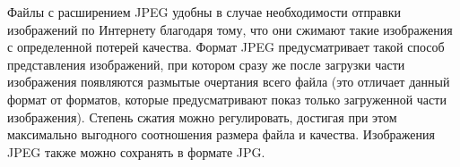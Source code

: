 \documentclass{beamer}
\begin{document}
\begin{frame}
Файлы с расширением JPEG удобны в случае необходимости отправки изображений по Интернету благодаря тому, что они сжимают такие изображения с определенной потерей качества. Формат JPEG предусматривает такой способ представления изображений, при котором сразу же после загрузки части изображения появляются размытые очертания всего файла (это отличает данный формат от форматов, которые предусматривают показ только загруженной части изображения). Степень сжатия можно регулировать, достигая при этом максимально выгодного соотношения размера файла и качества. Изображения JPEG также можно сохранять в формате JPG.\\
\begin{figure}[H]
\begin{center}
\begin{minipage}[h]{0.25\linewidth}
  \\
\end{minipage}
\end{center}
\end{figure}
\end{frame}
\end{document}
